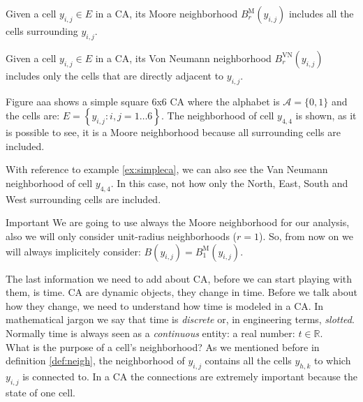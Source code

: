 \begin{definition}
\label{def:neighmoore}
Given a cell $y_{i,j} \in E$ in a CA, its Moore neighborhood $B^\text{M}_r\left( y_{i,j} \right)$
includes all the cells surrounding
$y_{i,j}$.
\end{definition}

\begin{definition}
\label{def:neighmoore}
Given a cell $y_{i,j} \in E$ in a CA, its Von Neumann neighborhood $B^\text{VN}_r\left( y_{i,j} \right)$
includes only the cells that are
directly adjacent to $y_{i,j}$.
\end{definition}

\begin{example}
\label{ex:simpleca}
Figure aaa shows a simple square 6x6 CA where the alphabet is $\mathcal{A}=\{ 0, 1 \}$ and the
cells are: $E = \left\{ y_{i,j} : i,j = 1 \dots 6 \right\}$. The neighborhood of cell $y_{4,4}$
is shown, as it is possible to see, it is a Moore neighborhood because all surrounding cells are
included.
\end{example}

\begin{example}
\label{ex:vnneigh}
With reference to example \ref{ex:simpleca}, we can also see the Van Neumann neighborhood of
cell $y_{4,4}$. In this case, not how only the North, East, South and West surrounding cells
are included.
\end{example}

\begin{important}{Important}
We are going to use always the Moore neighborhood for our analysis, also we will only consider
unit-radius neighborhoods ($r=1$). So, from now on we will always implicitely consider:
$B\left( y_{i,j} \right) = B^\text{M}_1\left( y_{i,j} \right)$.
\end{important}

The last information we need to add about CA, before we can start playing with them, is time.
CA are dynamic objects, they change in time. Before we talk about how they change, we need to
understand how time is modeled in a CA. In mathematical jargon we say that time is 
\textit{discrete} or, in engineering terms, \textit{slotted}. Normally time is always seen as a
\textit{continuous} entity: a real number: $t \in \mathbb{R}$.\\

What is the purpose of a cell's neighborhood? As we mentioned before in definition \ref{def:neigh},
the neighborhood of $y_{i,j}$ contains all the cells $y_{h,k}$ to which $y_{i,j}$ is connected to.
In a CA the connections are extremely important because the state of one cell.
